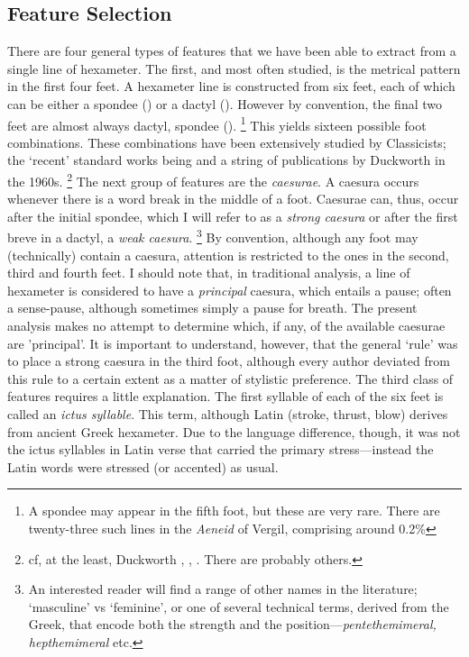 \documentclass[11pt,a4paper]{scrartcl} %
\begin{document}
{\subsection{Feature Selection}
There are four general types of features that we have been able to extract from a single line of hexameter. The first, and most often studied, is the metrical pattern in the first four feet. A hexameter line is constructed from six feet, each of which can be either a spondee (\metricsymbols{_ _}) or a dactyl (). However by convention, the final two feet are almost always dactyl, spondee ().%
\footnote{A spondee may appear in the fifth foot, but these are very rare. There are twenty-three such lines in the \textit{Aeneid} of Vergil, comprising around 0.2\%}
This yields sixteen possible foot combinations. These combinations have been extensively studied by Classicists; the `recent' standard works being \cite{platnauer_1951} and a string of publications by Duckworth in the 1960s.%
\footnote{cf, at the least, Duckworth \citeyear{duckworth_horaces_1965}, \citeyear{duckworth_five_1967}, \citeyear{duckworth_maphaeus_1969} \citeyear{duckworth_vergil_1969}. There are probably others.}
The next group of features are the \textit{caesurae}. A caesura occurs whenever there is a word break in the middle of a foot. Caesurae can, thus, occur after the initial spondee, which I will refer to as a \textit{strong caesura} or after the first breve in a dactyl, a \textit{weak caesura}.%
\footnote{An interested reader will find a range of other names in the literature; `masculine' vs `feminine', or one of several technical terms, derived from the Greek, that encode both the strength and the position---\textit{pentethemimeral, hepthemimeral} etc.}
By convention, although any foot may (technically) contain a caesura, attention is restricted to the ones in the second, third and fourth feet. I should note that, in traditional analysis, a line of hexameter is considered to have a \textit{principal} caesura, which entails a pause; often a sense-pause, although sometimes simply a pause for breath. The present analysis makes no attempt to determine which, if any, of the available caesurae are 'principal'. It is important to understand, however, that the general `rule' was to place a strong caesura in the third foot, although every author deviated from this rule to a certain extent as a matter of stylistic preference. The third class of features requires a little explanation. The first syllable of each of the six feet is called an \textit{ictus syllable}. This term, although Latin (stroke, thrust, blow) derives from ancient Greek hexameter. Due to the language difference, though, it was not the ictus syllables in Latin verse that carried the primary stress---instead the Latin words were stressed (or accented) as usual.%
}
\end{document}
